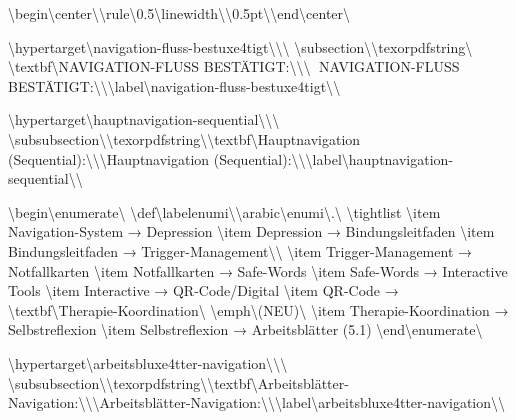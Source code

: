 \textbackslash{}begin\textbackslash{}{center\textbackslash{}}\textbackslash{}rule\textbackslash{}{0.5\textbackslash{}linewidth\textbackslash{}}\textbackslash{}{0.5pt\textbackslash{}}\textbackslash{}end\textbackslash{}{center\textbackslash{}}

\textbackslash{}hypertarget\textbackslash{}{navigation-fluss-bestuxe4tigt\textbackslash{}}\textbackslash{}{\textbackslash{}%
\textbackslash{}subsection\textbackslash{}{\textbackslash{}texorpdfstring\textbackslash{}{🎯 \textbackslash{}textbf\textbackslash{}{NAVIGATION-FLUSS BESTÄTIGT:\textbackslash{}}\textbackslash{}}\textbackslash{}{🎯 NAVIGATION-FLUSS BESTÄTIGT:\textbackslash{}}\textbackslash{}}\textbackslash{}label\textbackslash{}{navigation-fluss-bestuxe4tigt\textbackslash{}}\textbackslash{}}

\textbackslash{}hypertarget\textbackslash{}{hauptnavigation-sequential\textbackslash{}}\textbackslash{}{\textbackslash{}%
\textbackslash{}subsubsection\textbackslash{}{\textbackslash{}texorpdfstring\textbackslash{}{\textbackslash{}textbf\textbackslash{}{Hauptnavigation (Sequential):\textbackslash{}}\textbackslash{}}\textbackslash{}{Hauptnavigation (Sequential):\textbackslash{}}\textbackslash{}}\textbackslash{}label\textbackslash{}{hauptnavigation-sequential\textbackslash{}}\textbackslash{}}

\textbackslash{}begin\textbackslash{}{enumerate\textbackslash{}}
\textbackslash{}def\textbackslash{}labelenumi\textbackslash{}{\textbackslash{}arabic\textbackslash{}{enumi\textbackslash{}}.\textbackslash{}}
\textbackslash{}tightlist
\textbackslash{}item
  Navigation-System → Depression
\textbackslash{}item
  Depression → Bindungsleitfaden
\textbackslash{}item
  Bindungsleitfaden → Trigger-Management\textbackslash{}\textbackslash{}
\textbackslash{}item
  Trigger-Management → Notfallkarten
\textbackslash{}item
  Notfallkarten → Safe-Words
\textbackslash{}item
  Safe-Words → Interactive Tools
\textbackslash{}item
  Interactive → QR-Code/Digital
\textbackslash{}item
  QR-Code → \textbackslash{}textbf\textbackslash{}{Therapie-Koordination\textbackslash{}} \textbackslash{}emph\textbackslash{}{(NEU)\textbackslash{}}
\textbackslash{}item
  Therapie-Koordination → Selbstreflexion
\textbackslash{}item
  Selbstreflexion → Arbeitsblätter (5.1)
\textbackslash{}end\textbackslash{}{enumerate\textbackslash{}}

\textbackslash{}hypertarget\textbackslash{}{arbeitsbluxe4tter-navigation\textbackslash{}}\textbackslash{}{\textbackslash{}%
\textbackslash{}subsubsection\textbackslash{}{\textbackslash{}texorpdfstring\textbackslash{}{\textbackslash{}textbf\textbackslash{}{Arbeitsblätter-Navigation:\textbackslash{}}\textbackslash{}}\textbackslash{}{Arbeitsblätter-Navigation:\textbackslash{}}\textbackslash{}}\textbackslash{}label\textbackslash{}{arbeitsbluxe4tter-navigation\textbackslash{}}\textbackslash{}}

